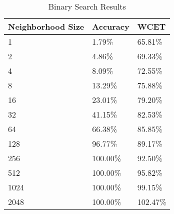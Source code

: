 \begin{table}[]
  \centering
  \caption{Binary Search Results}
  \label{bsearchT}
  \begin{tabular}{|l|l|l|}
    \hline
    \textbf{Neighborhood Size} & \textbf{Accuracy}     & \textbf{WCET}           \\ \hline
1 &  1.79\%&65.81\%   \\ \hline
2 &  4.86\%&69.33\%   \\ \hline
4 &  8.09\%&72.55\%   \\ \hline
8 &  13.29\%&75.88\%   \\ \hline
16 &  23.01\%&79.20\%   \\ \hline
32 &  41.15\%&82.53\%   \\ \hline
64 &  66.38\%&85.85\%   \\ \hline
128 &  96.77\%&89.17\%   \\ \hline
256 &  100.00\%&92.50\%   \\ \hline
512 &  100.00\%&95.82\%   \\ \hline
1024 &  100.00\%&99.15\%   \\ \hline
2048 &  100.00\%&102.47\%   \\ \hline
  \end{tabular}
\end{table}
